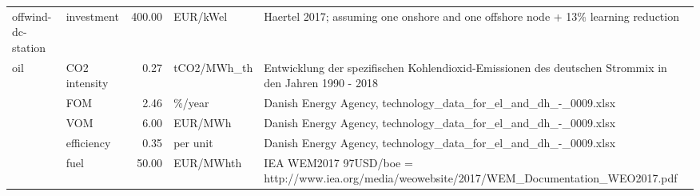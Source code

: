 \begin{longtable}{p{5cm}p{3cm}rp{3cm}p{11cm}}
offwind-dc-station & investment &         400.00 &                          EUR/kWel &                                                                                                                                                                                                                                                    Haertel 2017; assuming one onshore and one offshore node + 13\% learning reduction \\
oil & CO2 intensity &           0.27 &                       tCO2/MWh\_th &                                                                                                                                                                                                                                Entwicklung der spezifischen Kohlendioxid-Emissionen des deutschen Strommix in den Jahren 1990 - 2018 \\
                      & FOM &           2.46 &                            \%/year &                                                                                                                                                                                                                                                                      Danish Energy Agency, technology\_data\_for\_el\_and\_dh\_-\_0009.xlsx \\
                      & VOM &           6.00 &                           EUR/MWh &                                                                                                                                                                                                                                                                      Danish Energy Agency, technology\_data\_for\_el\_and\_dh\_-\_0009.xlsx \\
                      & efficiency &           0.35 &                          per unit &                                                                                                                                                                                                                                                                      Danish Energy Agency, technology\_data\_for\_el\_and\_dh\_-\_0009.xlsx \\
                      & fuel &          50.00 &                         EUR/MWhth &                                                                                                                                                                                                                                       IEA WEM2017 97USD/boe = http://www.iea.org/media/weowebsite/2017/WEM\_Documentation\_WEO2017.pdf \\

\end{longtable}
